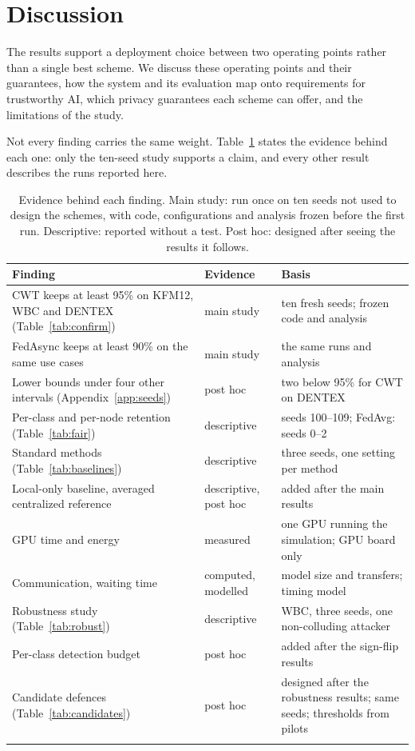 \documentclass[pdflatex,sn-mathphys-num]{sn-jnl}
\begin{document}
\section{Discussion}\label{sec:discussion}

The results support a deployment choice between two operating points rather than a single best scheme. We discuss these operating points and their guarantees, how the system and its evaluation map onto requirements for trustworthy AI, which privacy guarantees each scheme can offer, and the limitations of the study.

Not every finding carries the same weight. Table~\ref{tab:evidence} states the evidence behind each one: only the ten-seed study supports a claim, and every other result describes the runs reported here.

\begin{table}[t]
\caption{Evidence behind each finding. Main study: run once on ten seeds not used to design the schemes, with code, configurations and analysis frozen before the first run. Descriptive: reported without a test. Post hoc: designed after seeing the results it follows.}\label{tab:evidence}
\footnotesize
\begin{tabular*}{\textwidth}{@{\extracolsep\fill}>{\raggedright\arraybackslash}p{}>{\raggedright\arraybackslash}p{}>{\raggedright\arraybackslash}p{}}
\toprule
Finding & Evidence & Basis \\
\midrule
CWT keeps at least 95\% on KFM12, WBC and DENTEX (Table~\ref{tab:confirm}) & main study & ten fresh seeds; frozen code and analysis \\
FedAsync keeps at least 90\% on the same use cases & main study & the same runs and analysis \\
Lower bounds under four other intervals (Appendix~\ref{app:seeds}) & post hoc & two below 95\% for CWT on DENTEX \\
Per-class and per-node retention (Table~\ref{tab:fair}) & descriptive & seeds 100--109; FedAvg: seeds 0--2 \\
Standard methods (Table~\ref{tab:baselines}) & descriptive & three seeds, one setting per method \\
Local-only baseline, averaged centralized reference & descriptive, post hoc & added after the main results \\
GPU time and energy & measured & one GPU running the simulation; GPU board only \\
Communication, waiting time & computed, modelled & model size and transfers; timing model \\
Robustness study (Table~\ref{tab:robust}) & descriptive & WBC, three seeds, one non-colluding attacker \\
Per-class detection budget & post hoc & added after the sign-flip results \\
Candidate defences (Table~\ref{tab:candidates}) & post hoc & designed after the robustness results; same seeds; thresholds from pilots \\
\botrule
\end{tabular*}
\end{table}
\end{document}
